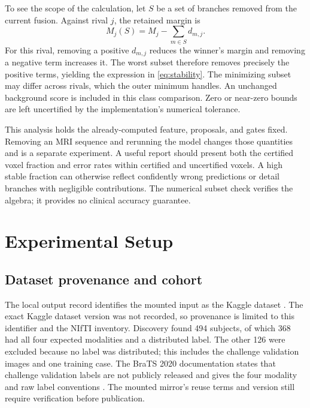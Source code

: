 \documentclass[conference]{IEEEtran}
\begin{document}
To see the scope of the calculation, let $S$ be a set of branches removed from the current fusion. Against rival $j$, the retained margin is
\begin{equation}
M_j(S)=M_j-\sum_{m\in S}d_{m,j}.
\label{eq:subsetmargin}
\end{equation}
For this rival, removing a positive $d_{m,j}$ reduces the winner's margin and removing a negative term increases it. The worst subset therefore removes precisely the positive terms, yielding the expression in \eqref{eq:stability}. The minimizing subset may differ across rivals, which the outer minimum handles. An unchanged background score is included in this class comparison. Zero or near-zero bounds are left uncertified by the implementation's numerical tolerance.

This analysis holds the already-computed feature, proposals, and gates fixed. Removing an MRI sequence and rerunning the model changes those quantities and is a separate experiment. A useful report should present both the certified voxel fraction and error rates within certified and uncertified voxels. A high stable fraction can otherwise reflect confidently wrong predictions or detail branches with negligible contributions. The numerical subset check verifies the algebra; it provides no clinical accuracy guarantee.

\section{Experimental Setup}
\subsection{Dataset provenance and cohort}
The local output record identifies the mounted input as the Kaggle dataset . The exact Kaggle dataset version was not recorded, so provenance is limited to this identifier and the NIfTI inventory. Discovery found 494 subjects, of which 368 had all four expected modalities and a distributed label. The other 126 were excluded because no label was distributed; this includes the challenge validation images and one training case. The BraTS 2020 documentation states that challenge validation labels are not publicly released and gives the four modality and raw label conventions \cite{brats2020data}. The mounted mirror's reuse terms and version still require verification before publication.
\end{document}
